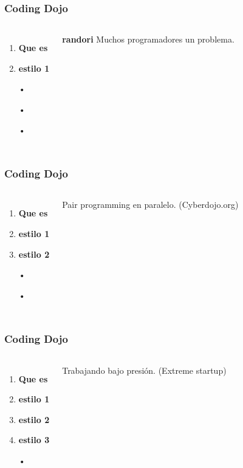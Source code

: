 \documentclass{beamer}
\begin{document}
\begin{frame}
\frametitle{Coding Dojo}
\begin{columns}[c] %

\begin{enumerate}
\item \textbf{Que es}
\item \textbf{estilo 1}
\item[•]
\item[•]
\item[•]

\end{enumerate}

\textbf{randori} Muchos programadores un problema.
\end{columns}
\end{frame}

\begin{frame}
\frametitle{Coding Dojo}
\begin{columns}[c] %

\begin{enumerate}
\item \textbf{Que es}
\item \textbf{estilo 1}
\item \textbf{estilo 2}
\item[•]
\item[•]

\end{enumerate}

Pair programming en paralelo. (Cyberdojo.org)
\end{columns}
\end{frame}

\begin{frame}
\frametitle{Coding Dojo}
\begin{columns}[c] %

\begin{enumerate}
\item \textbf{Que es}
\item \textbf{estilo 1}
\item \textbf{estilo 2}
\item \textbf{estilo 3}
\item[•]

\end{enumerate}

Trabajando bajo presi\'on. (Extreme startup)
\end{columns}
\end{frame}
\end{document}
